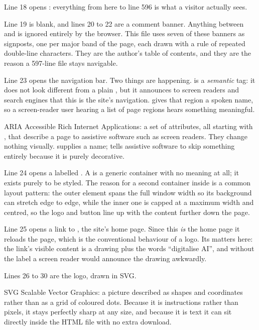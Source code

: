 Line 18 opens : everything from here to line 596 is what a visitor
actually sees.

Line 19 is blank, and lines 20 to 22 are a comment banner. Anything between
\code{<!-{}-} and \code{-{}->} is ignored entirely by the browser. This file uses
seven of these banners as signposts, one per major band of the page, each drawn
with a rule of repeated double-line characters. They are the author's table of
contents, and they are the reason a 597-line file stays navigable.

Line 23 opens the navigation bar. Two things are happening.  is a
\emph{semantic} tag: it does not look different from a plain , but it
announces to screen readers and search engines that this is the site's
navigation.  gives that region a spoken name,
so a screen-reader user hearing a list of page regions hears something meaningful.

\begin{jargon}{ARIA}
Accessible Rich Internet Applications: a set of attributes, all starting with
, that describe a page to assistive software such as screen readers.
They change nothing visually.  supplies a name;
 tells assistive software to skip something entirely
because it is purely decorative.
\end{jargon}

Line 24 opens a  labelled . A  is a
generic container with no meaning at all; it exists purely to be styled. The
reason for a second container inside  is a common layout pattern: the
outer element spans the full window width so its background can stretch edge to
edge, while the inner one is capped at a maximum width and centred, so the logo
and button line up with the content further down the page.

Line 25 opens a link to \code{/}, the site's home page. Since this \emph{is} the
home page it reloads the page, which is the conventional behaviour of a logo.
Its  matters here: the link's visible content is a drawing plus
the words ``digitalise AI'', and without the label a screen reader would announce
the drawing awkwardly.

Lines 26 to 30 are the logo, drawn in SVG.

\begin{jargon}{SVG}
Scalable Vector Graphics: a picture described as shapes and coordinates rather
than as a grid of coloured dots. Because it is instructions rather than pixels,
it stays perfectly sharp at any size, and because it is text it can sit directly
inside the HTML file with no extra download.
\end{jargon}

